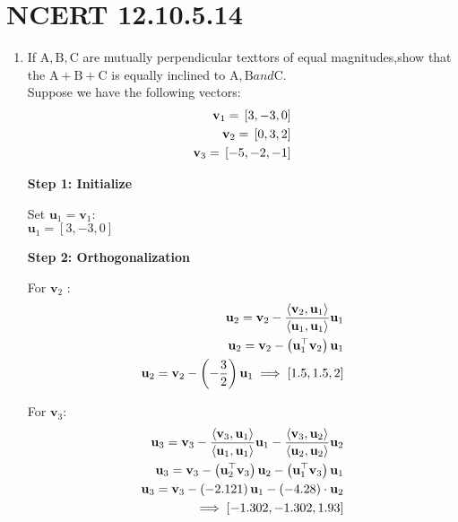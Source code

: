 \documentclass[11pt]{book}
\begin{document}
\section*{NCERT 12.10.5.14}
\begin{enumerate}
    \item If $ \text{A},\text{B},\text{C} $ are mutually perpendicular texttors of equal magnitudes,show that the  $ \text{A}+\text{B}+\text{C} $ is equally inclined to $ \text{A},\text{B} and \text{C} $.\\
    Suppose we have the following vectors:
    \begin{align}
        \mathbf{v}_1 = {}\left[3 ,-3 ,0\right]  \\
        \mathbf{v}_2 = {}\left[0, 3, 2\right]  \\
        \mathbf{v}_3 = {}\left[-5, -2, -1\right]
    \end{align}

\textbf{Step 1: Initialize}

Set $\mathbf{u}_1 = \mathbf{v}_1$:\\
 $\mathbf{u}_1 = [3, -3, 0] $

\textbf{Step 2: Orthogonalization}

For  $ \mathbf{v}_2$ :
 \begin{align}
     \mathbf{u}_2 = \mathbf{v}_2 - \frac{\langle \mathbf{v}_2, \mathbf{u}_1 \rangle}{\langle \mathbf{u}_1, \mathbf{u}_1 \rangle} \mathbf{u}_1 \\
     \mathbf{u}_2=\mathbf{v}_2- \left(\mathbf{u}_1 ^\top \mathbf{v}_2\right) \mathbf{u}_1\\ 
     \mathbf{u}_2 = \mathbf{v}_2 - \left(-\frac{3}{2}\right) \mathbf{u}_1 
     \implies [1.5, 1.5, 2] 
 \end{align}

For $\mathbf{v}_3 $:
\begin{align}
    \mathbf{u}_3 = \mathbf{v}_3 - \frac{\langle \mathbf{v}_3, \mathbf{u}_1 \rangle}{\langle \mathbf{u}_1, \mathbf{u}_1 \rangle} \mathbf{u}_1 - \frac{\langle \mathbf{v}_3, \mathbf{u}_2 \rangle}{\langle \mathbf{u}_2, \mathbf{u}_2 \rangle} \mathbf{u}_2 \\
    \mathbf{u}_3=\mathbf{v}_3- \left(\mathbf{u}_2 ^\top \mathbf{v}_3\right) \mathbf{u}_2- \left(\mathbf{u}_1 ^\top \mathbf{v}_3\right) \mathbf{u}_1\\ 
\mathbf{u}_3 = \mathbf{v}_3 - \left(-2.121\right) \mathbf{u}_1 - \left(-4.28\right) \cdot \mathbf{u}_2 \\
\implies[-1.302, -1.302, 1.93] 
\end{align}


\end{enumerate}
\end{document}
